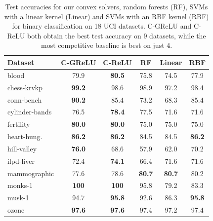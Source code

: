 \setlength{\tabcolsep}{3pt} %
\begin{table}[t]
	\centering
	\caption{Test accuracies for our convex solvers, random forests (RF), SVMs with a linear kernel (Linear)
		and SVMs with an RBF kernel (RBF) for binary classification on 18 UCI datasets.
		C-GReLU and C-ReLU both obtain the best test accuracy on 9 datasets,
		while the most competitive baseline is best on just 4.
	}%
	\label{table:binary-uci-accuracies}
	\vspace{0.1in}
	\begin{small}
		\begin{tabular}{lccccc} \toprule
			\textbf{Dataset} & \textbf{C-GReLU} & \textbf{C-ReLU} & \textbf{RF}   & \textbf{Linear} & \textbf{RBF}  \\ \midrule
			blood            & 79.9             & \textbf{80.5}   & 75.8          & 74.5            & 77.9          \\
			chess-krvkp      & \textbf{99.2}    & 98.6            & 98.9          & 97.2            & 98.4          \\
			conn-bench       & \textbf{90.2}    & 85.4            & 73.2          & 68.3            & 85.4          \\
			cylinder-bands   & 76.5             & \textbf{78.4}   & 77.5          & 71.6            & 71.6          \\
			fertility        & \textbf{80.0}    & \textbf{80.0}   & 75.0          & 75.0            & 75.0          \\
			heart-hung.      & \textbf{86.2}    & \textbf{86.2}   & 84.5          & 84.5            & \textbf{86.2} \\
			hill-valley      & \textbf{76.0}    & 68.6            & 57.9          & 62.0            & 70.2          \\
			ilpd-liver       & 72.4             & \textbf{74.1}   & 66.4          & 71.6            & 71.6          \\
			mammographic     & 77.6             & 78.6            & \textbf{80.7} & \textbf{80.7}   & 80.2          \\
			monks-1          & \textbf{100}     & \textbf{100}    & 95.8          & 79.2            & 83.3          \\
			musk-1           & 94.7             & \textbf{95.8}   & 92.6          & 86.3            & \textbf{95.8} \\
			ozone            & \textbf{97.6}    & \textbf{97.6}   & 97.4          & 97.2            & 97.4          \\

\end{tabular}
\end{small}
\end{table}
